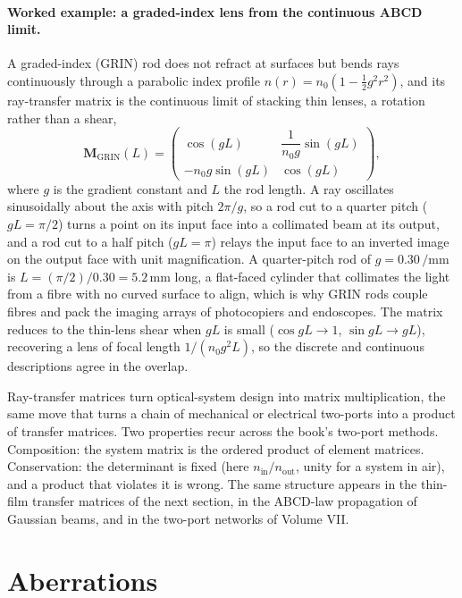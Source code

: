 \paragraph{Worked example: a graded-index lens from the continuous ABCD limit.} A
graded-index (GRIN) rod does not refract at surfaces but bends rays continuously
through a parabolic index profile $n(r) = n_0(1 - \tfrac{1}{2}g^2 r^2)$, and its
ray-transfer matrix is the continuous limit of stacking thin lenses, a rotation
rather than a shear,
\[
\mathbf{M}_{\mathrm{GRIN}}(L) = \begin{pmatrix}
\cos(gL) & \dfrac{1}{n_0 g}\sin(gL) \\[4pt]
-n_0 g\sin(gL) & \cos(gL)\end{pmatrix},
\]
where $g$ is the gradient constant and $L$ the rod length. A ray oscillates
sinusoidally about the axis with pitch $2\pi/g$, so a rod cut to a quarter pitch
($gL = \pi/2$) turns a point on its input face into a collimated beam at its
output, and a rod cut to a half pitch ($gL = \pi$) relays the input face to an
inverted image on the output face with unit magnification. A quarter-pitch rod of
$g = 0.30\,\si{\per\milli\meter}$ is $L = (\pi/2)/0.30 = 5.2\,\si{\milli\meter}$
long, a flat-faced cylinder that collimates the light from a fibre with no curved
surface to align, which is why GRIN rods couple fibres and pack the imaging arrays
of photocopiers and endoscopes. The matrix reduces to the thin-lens shear when
$gL$ is small ($\cos gL \to 1$, $\sin gL \to gL$), recovering a lens of focal
length $1/(n_0 g^2 L)$, so the discrete and continuous descriptions agree in the
overlap.

\begin{archetype}
Ray-transfer matrices turn optical-system design into matrix multiplication, the
same move that turns a chain of mechanical or electrical two-ports into a product
of transfer matrices. Two properties recur across the book's two-port methods.
Composition: the system matrix is the ordered product of element matrices.
Conservation: the determinant is fixed (here $n_{\text{in}}/n_{\text{out}}$,
unity for a system in air), and a product that violates it is wrong. The same
structure appears in the thin-film transfer matrices of the next section, in the
ABCD-law propagation of Gaussian beams, and in the two-port networks of Volume
VII.
\end{archetype}

\section{Aberrations}


